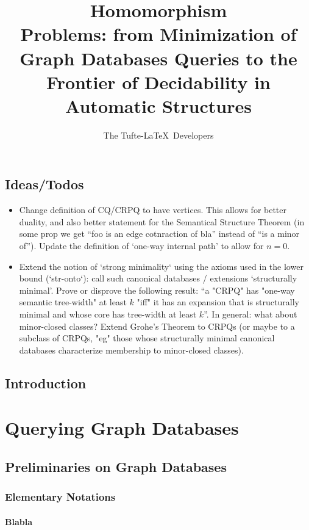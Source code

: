 \documentclass[a4paper,sfsidenotes,twoside,justified]{tufte-book-custom}
\title[On Homomorphism Problems]{ Homomorphism\\ Problems: from Minimization of Graph Databases Queries to the Frontier of Decidability in Automatic Structures}
\author[The Tufte-LaTeX Developers]{The Tufte-LaTeX\ Developers}
\begin{document}
\frontmatter





\mainmatter
\chapter{Ideas/Todos}

\begin{itemize}
	\item Change definition of CQ/CRPQ to have vertices. This allows for better duality,
		and also better statement for the Semantical Structure Theorem (in some prop we get
		``foo is an edge cotnraction of bla'' instead of ``is a minor of'').
		Update the definition of `one-way internal path' to allow for $n=0$.
	\item Extend the notion of `strong minimality` using the axioms used in the lower bound (`str-onto`): call such canonical databases / extensions `structurally minimal'.
	Prove or disprove the following result: ``a "CRPQ" has "one-way semantic tree-width" at least $k$ "iff" it has an expansion that is structurally minimal and whose core has tree-width at least $k$''. In general: what about minor-closed classes?
	Extend Grohe's Theorem to CRPQs (or maybe to a subclass of CRPQs, "eg" those whose
	structurally minimal canonical databases characterize membership to minor-closed classes).
\end{itemize}

\chapter{Introduction}

\part{Querying Graph Databases}

\chapter{Preliminaries on Graph Databases}

\section{Elementary Notations}

\subsection{Blabla}
\end{document}
